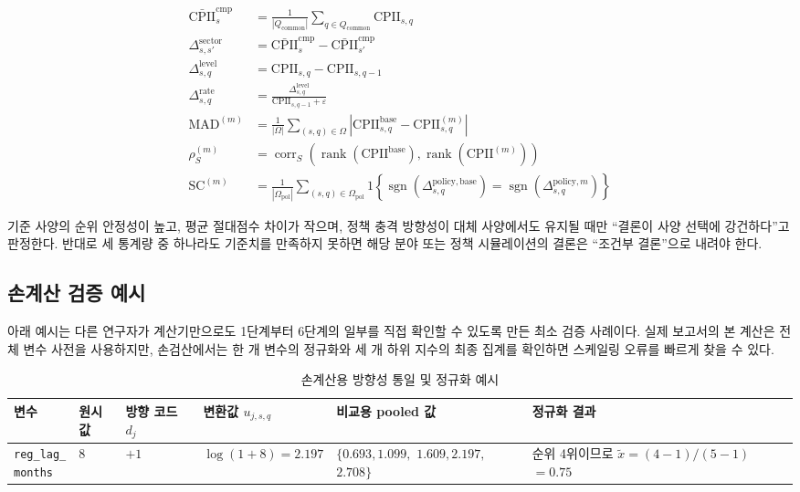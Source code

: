 \documentclass[11pt,a4paper]{report}
\newcommand{\VCell}[1]{\shortstack[l]{#1}}
\begin{document}
\begin{align}
\bar{\mathrm{CPII}}^{\mathrm{cmp}}_{s} &= \frac{1}{|Q_{\mathrm{common}}|}\sum_{q \in Q_{\mathrm{common}}}\mathrm{CPII}_{s,q} \\
\Delta^{\mathrm{sector}}_{s,s'} &= \bar{\mathrm{CPII}}^{\mathrm{cmp}}_{s}-\bar{\mathrm{CPII}}^{\mathrm{cmp}}_{s'} \\
\Delta^{\mathrm{level}}_{s,q} &= \mathrm{CPII}_{s,q}-\mathrm{CPII}_{s,q-1} \\
\Delta^{\mathrm{rate}}_{s,q} &= \frac{\Delta^{\mathrm{level}}_{s,q}}{\mathrm{CPII}_{s,q-1}+\varepsilon} \\
\mathrm{MAD}^{(m)} &= \frac{1}{|\Omega|}\sum_{(s,q) \in \Omega}\left|\mathrm{CPII}^{\mathrm{base}}_{s,q}-\mathrm{CPII}^{(m)}_{s,q}\right| \\
\rho^{(m)}_{S} &= \operatorname{corr}_{S}\!\left(\operatorname{rank}\!\left(\mathrm{CPII}^{\mathrm{base}}\right), \operatorname{rank}\!\left(\mathrm{CPII}^{(m)}\right)\right) \\
\mathrm{SC}^{(m)} &= \frac{1}{|\Omega_{\mathrm{pol}}|}\sum_{(s,q) \in \Omega_{\mathrm{pol}}}1\!\left\{\operatorname{sgn}\!\left(\Delta^{\mathrm{policy,base}}_{s,q}\right)=\operatorname{sgn}\!\left(\Delta^{\mathrm{policy},m}_{s,q}\right)\right\} \label{eq:cpii_comparison_metrics}
\end{align}

기준 사양의 순위 안정성이 높고, 평균 절대점수 차이가 작으며, 정책 충격 방향성이 대체 사양에서도 유지될 때만 ``결론이 사양 선택에 강건하다''고 판정한다. 반대로 세 통계량 중 하나라도 기준치를 만족하지 못하면 해당 분야 또는 정책 시뮬레이션의 결론은 ``조건부 결론''으로 내려야 한다.

\subsection{손계산 검증 예시}
아래 예시는 다른 연구자가 계산기만으로도 1단계부터 6단계의 일부를 직접 확인할 수 있도록 만든 최소 검증 사례이다. 실제 보고서의 본 계산은 전체 변수 사전을 사용하지만, 손검산에서는 한 개 변수의 정규화와 세 개 하위 지수의 최종 집계를 확인하면 스케일링 오류를 빠르게 찾을 수 있다.

\begin{table}[H]
  \centering
  \small
  \caption{손계산용 방향성 통일 및 정규화 예시}\label{tab:cpii_handcheck_normalization}
  \footnotesize
  \begin{tabular}{p{2.0cm}p{1.2cm}p{1.0cm}p{1.8cm}p{2.4cm}p{3.2cm}}
    \toprule
    \rowcolor{ReportTableHead}
    변수 & 원시값 & 방향 코드 $d_j$ & 변환값 $u_{j,s,q}$ & 비교용 pooled 값 & 정규화 결과 \\
    \midrule
    \VCell{\texttt{reg\_lag\_}\\\texttt{months}} & $8$ & $+1$ & $\log(1+8)=2.197$ & \VCell{$\{0.693,1.099,$\\$1.609,2.197,$\\$2.708\}$} & \VCell{순위 4위이므로\\$\widetilde{x}=(4-1)/(5-1)$\\$=0.75$} \\
    \bottomrule
  \end{tabular}
\end{table}
\end{document}
